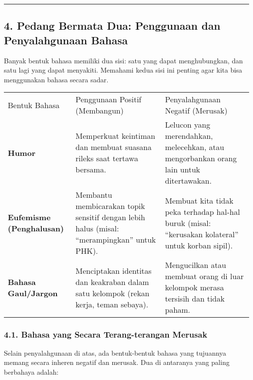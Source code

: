 \documentclass[
  letterpaper,
  DIV=11,
  numbers=noendperiod]{scrreprt}
\begin{document}
\begin{center}\rule{0.5\linewidth}{0.5pt}\end{center}

\subsection{4. Pedang Bermata Dua: Penggunaan dan Penyalahgunaan
Bahasa}\label{pedang-bermata-dua-penggunaan-dan-penyalahgunaan-bahasa}

Banyak bentuk bahasa memiliki dua sisi: satu yang dapat menghubungkan,
dan satu lagi yang dapat menyakiti. Memahami kedua sisi ini penting agar
kita bisa menggunakan bahasa secara sadar.

\begin{longtable}[]{@{}
  >{\raggedright\arraybackslash}p{}
  >{\raggedright\arraybackslash}p{}
  >{\raggedright\arraybackslash}p{}@{}}
\toprule\noalign{}
\endhead
\bottomrule\noalign{}
\endlastfoot
Bentuk Bahasa & Penggunaan Positif (Membangun) & Penyalahgunaan Negatif
(Merusak) \\
\textbf{Humor} & Memperkuat keintiman dan membuat suasana rileks saat
tertawa bersama. & Lelucon yang merendahkan, melecehkan, atau
mengorbankan orang lain untuk ditertawakan. \\
\textbf{Eufemisme (Penghalusan)} & Membantu membicarakan topik sensitif
dengan lebih halus (misal: ``merampingkan'' untuk PHK). & Membuat kita
tidak peka terhadap hal-hal buruk (misal: ``kerusakan kolateral'' untuk
korban sipil). \\
\textbf{Bahasa Gaul/Jargon} & Menciptakan identitas dan keakraban dalam
satu kelompok (rekan kerja, teman sebaya). & Mengucilkan atau membuat
orang di luar kelompok merasa tersisih dan tidak paham. \\
\end{longtable}

\subsubsection{4.1. Bahasa yang Secara Terang-terangan
Merusak}\label{bahasa-yang-secara-terang-terangan-merusak}

Selain penyalahgunaan di atas, ada bentuk-bentuk bahasa yang tujuannya
memang secara inheren negatif dan merusak. Dua di antaranya yang paling
berbahaya adalah:
\end{document}
